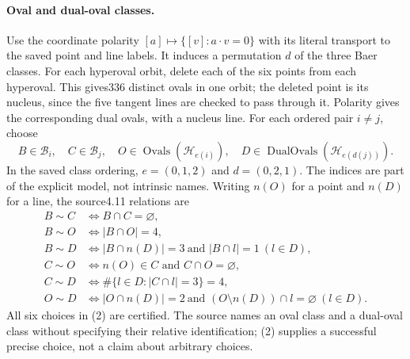 \documentclass[11pt]{article}
\newcommand{\orb}{\mathcal B}\newcommand{\hyp}{\mathcal H}
\begin{document}
\paragraph{Oval and dual-oval classes.}
Use the coordinate polarity $[a]\mapsto\{[v]:a\cdot v=0\}$ with its
literal transport to the saved point and line labels. It induces a permutation
$d$ of the three Baer classes. For each hyperoval orbit, delete each of the
six points from each hyperoval. This gives336 distinct ovals in one orbit;
the deleted point is its nucleus, since the five tangent lines are checked
to pass through it. Polarity gives the corresponding dual ovals, with a
nucleus line. For each ordered pair $i\ne j$, choose
\[
 B\in\orb_i,\quad C\in\orb_j,\quad
 O\in\operatorname{Ovals}(\hyp_{e(i)}),\quad
 D\in\operatorname{DualOvals}(\hyp_{e(d(j))}).             \tag{2}
\]
In the saved class ordering, $e=(0,1,2)$ and $d=(0,2,1)$.
The indices are part of the explicit model, not intrinsic names.
Writing $n(O)$ for a point and $n(D)$ for a line, the source4.11 relations are
\begin{align*}
 B\sim C&\iff B\cap C=\varnothing,\\
 B\sim O&\iff |B\cap O|=4,\\
 B\sim D&\iff |B\cap n(D)|=3\ \text{and }|B\cap l|=1\ (l\in D),\\
 C\sim O&\iff n(O)\in C\text{ and }C\cap O=\varnothing,\\
 C\sim D&\iff \#\{l\in D:|C\cap l|=3\}=4,\\
 O\sim D&\iff |O\cap n(D)|=2\ \text{and }(O\setminus n(D))\cap l=\varnothing\ (l\in D).
\end{align*}
All six choices in (2) are certified. The source names an oval class and
a dual-oval class without specifying their relative identification; (2)
supplies a successful precise choice, not a claim about arbitrary choices.
\end{document}
